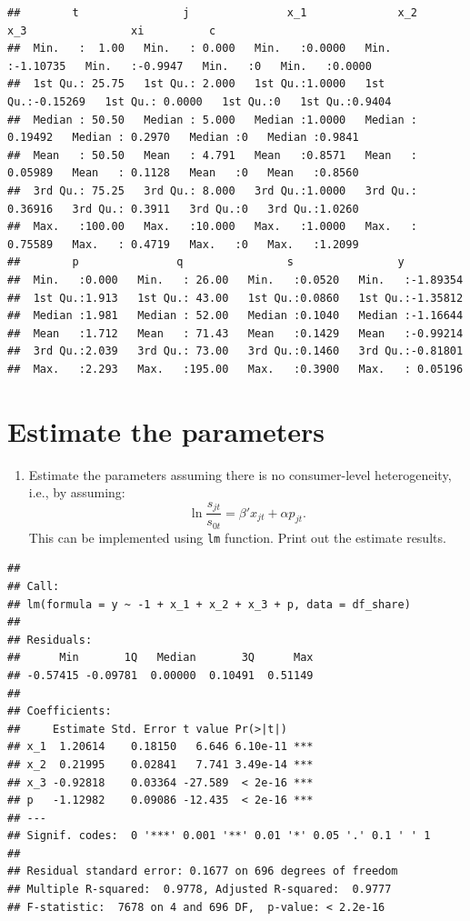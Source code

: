 \documentclass[
]{book}
\providecommand{\tightlist}{%
  \setlength{\itemsep}{0pt}\setlength{\parskip}{0pt}}
\begin{document}
\begin{verbatim}
##        t                j               x_1              x_2                x_3                xi          c         
##  Min.   :  1.00   Min.   : 0.000   Min.   :0.0000   Min.   :-1.10735   Min.   :-0.9947   Min.   :0   Min.   :0.0000  
##  1st Qu.: 25.75   1st Qu.: 2.000   1st Qu.:1.0000   1st Qu.:-0.15269   1st Qu.: 0.0000   1st Qu.:0   1st Qu.:0.9404  
##  Median : 50.50   Median : 5.000   Median :1.0000   Median : 0.19492   Median : 0.2970   Median :0   Median :0.9841  
##  Mean   : 50.50   Mean   : 4.791   Mean   :0.8571   Mean   : 0.05989   Mean   : 0.1128   Mean   :0   Mean   :0.8560  
##  3rd Qu.: 75.25   3rd Qu.: 8.000   3rd Qu.:1.0000   3rd Qu.: 0.36916   3rd Qu.: 0.3911   3rd Qu.:0   3rd Qu.:1.0260  
##  Max.   :100.00   Max.   :10.000   Max.   :1.0000   Max.   : 0.75589   Max.   : 0.4719   Max.   :0   Max.   :1.2099  
##        p               q                s                y           
##  Min.   :0.000   Min.   : 26.00   Min.   :0.0520   Min.   :-1.89354  
##  1st Qu.:1.913   1st Qu.: 43.00   1st Qu.:0.0860   1st Qu.:-1.35812  
##  Median :1.981   Median : 52.00   Median :0.1040   Median :-1.16644  
##  Mean   :1.712   Mean   : 71.43   Mean   :0.1429   Mean   :-0.99214  
##  3rd Qu.:2.039   3rd Qu.: 73.00   3rd Qu.:0.1460   3rd Qu.:-0.81801  
##  Max.   :2.293   Max.   :195.00   Max.   :0.3900   Max.   : 0.05196
\end{verbatim}

\hypertarget{estimate-the-parameters-1}{%
\section{Estimate the parameters}\label{estimate-the-parameters-1}}

\begin{enumerate}
\def\labelenumi{\arabic{enumi}.}
\tightlist
\item
  Estimate the parameters assuming there is no consumer-level heterogeneity, i.e., by assuming:
  \[
  \ln \frac{s_{jt}}{s_{0t}} = \beta' x_{jt} + \alpha p_{jt}.
  \]
  This can be implemented using \texttt{lm} function. Print out the estimate results.
\end{enumerate}

\begin{verbatim}
## 
## Call:
## lm(formula = y ~ -1 + x_1 + x_2 + x_3 + p, data = df_share)
## 
## Residuals:
##      Min       1Q   Median       3Q      Max 
## -0.57415 -0.09781  0.00000  0.10491  0.51149 
## 
## Coefficients:
##     Estimate Std. Error t value Pr(>|t|)    
## x_1  1.20614    0.18150   6.646 6.10e-11 ***
## x_2  0.21995    0.02841   7.741 3.49e-14 ***
## x_3 -0.92818    0.03364 -27.589  < 2e-16 ***
## p   -1.12982    0.09086 -12.435  < 2e-16 ***
## ---
## Signif. codes:  0 '***' 0.001 '**' 0.01 '*' 0.05 '.' 0.1 ' ' 1
## 
## Residual standard error: 0.1677 on 696 degrees of freedom
## Multiple R-squared:  0.9778, Adjusted R-squared:  0.9777 
## F-statistic:  7678 on 4 and 696 DF,  p-value: < 2.2e-16
\end{verbatim}
\end{document}
